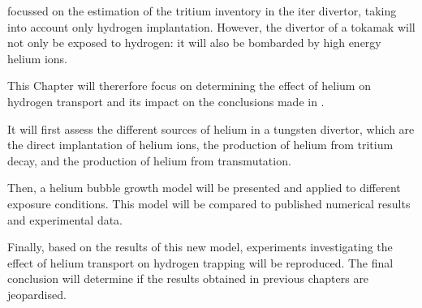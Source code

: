  focussed on the estimation of the tritium inventory in the \gls{iter} \gls{divertor}, taking into account only hydrogen implantation.
However, the \gls{divertor} of a \gls{tokamak} will not only be exposed to hydrogen: it will also be bombarded by high energy helium ions.

This Chapter will thererfore focus on determining the effect of helium on hydrogen transport and its impact on the conclusions made in .

It will first assess the different sources of helium in a tungsten \gls{divertor}, which are the direct implantation of helium ions, the production of helium from tritium decay, and the production of helium from \gls{transmutation}.

Then, a helium bubble growth model will be presented and applied to different exposure conditions.
This model will be compared to published numerical results and experimental data.

Finally, based on the results of this new model, experiments investigating the effect of helium transport on hydrogen trapping will be reproduced.
The final conclusion will determine if the results obtained in previous chapters are jeopardised.
